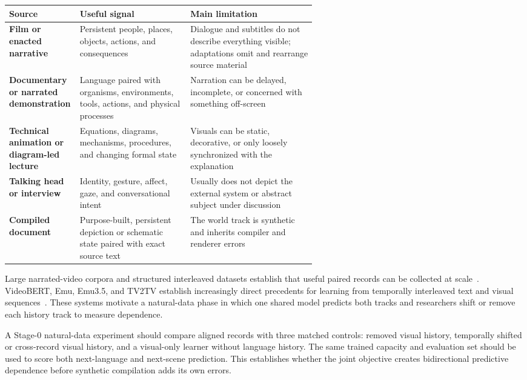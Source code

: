 \documentclass[11pt]{article}
\begin{document}
\begin{center}
\begin{tabularx}{0.97\linewidth}{@{}>{\bfseries}p{0.23\linewidth}p{0.36\linewidth}X@{}}
\toprule
Source & Useful signal & Main limitation \\
\midrule
Film or enacted narrative & Persistent people, places, objects, actions, and consequences & Dialogue and subtitles do not describe everything visible; adaptations omit and rearrange source material \\
Documentary or narrated demonstration & Language paired with organisms, environments, tools, actions, and physical processes & Narration can be delayed, incomplete, or concerned with something off-screen \\
Technical animation or diagram-led lecture & Equations, diagrams, mechanisms, procedures, and changing formal state & Visuals can be static, decorative, or only loosely synchronized with the explanation \\
Talking head or interview & Identity, gesture, affect, gaze, and conversational intent & Usually does not depict the external system or abstract subject under discussion \\
Compiled document & Purpose-built, persistent depiction or schematic state paired with exact source text & The world track is synthetic and inherits compiler and renderer errors \\
\bottomrule
\end{tabularx}
\end{center}

Large narrated-video corpora and structured interleaved datasets establish that useful paired records can be collected at scale~\cite{howto100m,multimodaltextbook,comm}. VideoBERT, Emu, Emu3.5, and TV2TV establish increasingly direct precedents for learning from temporally interleaved text and visual sequences~\cite{videobert,emu,emu35,tv2tv}. These systems motivate a natural-data phase in which one shared model predicts both tracks and researchers shift or remove each history track to measure dependence.

A Stage-0 natural-data experiment should compare aligned records with three matched controls: removed visual history, temporally shifted or cross-record visual history, and a visual-only learner without language history. The same trained capacity and evaluation set should be used to score both next-language and next-scene prediction. This establishes whether the joint objective creates bidirectional predictive dependence before synthetic compilation adds its own errors.
\end{document}
